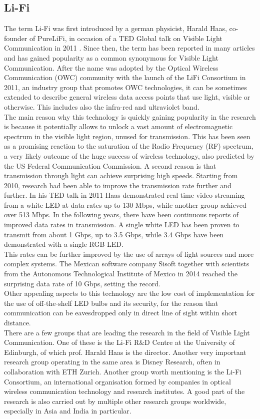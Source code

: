 \subsection{Li-Fi}
The term Li-Fi was first introduced by a german physicist, Harald Haas, co-founder of PureLiFi, in occasion of a TED Global talk on Visible Light Communication in 2011 \cite{tedtalk}.
Since then, the term has been reported in many articles and has gained popularity as a common synonymous for Visible Light Communication.
After the name was adopted by the Optical Wireless Communication (OWC) community with the launch of the LiFi Consortium in 2011, an industry group that promotes OWC technologies, it can be sometimes extended to describe general wireless data access points that use light, visible or otherwise.
This includes also the infra-red and ultraviolet band.\\
The main reason why this technology is quickly gaining popularity in the research is because it potentially allows to unlock a vast amount of electromagnetic spectrum in the visible light region, unused for transmission.\cite{haas1}
This has been seen as a promising reaction to the saturation of the Radio Frequency (RF) spectrum, a very likely outcome of the huge success of wireless technology, also predicted by the US Federal Communication Commission\cite{crisis}. 
A second reason is that transmission through light can achieve surprising high speeds.
Starting from 2010, research had been able to improve the transmission rate further and further.
In his TED talk in 2011 Haas demonstrated real time video streaming from a white LED at data rates up to 130 Mbps\cite{tedtalk}, while another group achieved over 513 Mbps\cite{500Mbps}.
In the following years, there have been continuous reports of improved data rates in transmission.
A single white LED has been proven to transmit from about 1 Gbps\cite{1Gbps}, up to 3.5 Gbps\cite{3.5Gbps}, while 3.4 Gbps have been demonstrated with a single RGB LED\cite{3.4Gbps}.\\
This rates can be further improved by the use of arrays of light sources and more complex systems.
The Mexican software company Sisoft together with scientists from the Autonomous Technological
Institute of Mexico in 2014 reached the surprising data rate of 10 Gbps, setting the record.\\
Other appealing aspects to this technology are the low cost of implementation for the use of off-the-shelf LED bulbs and its security, for the reason that communication can be eavesdropped only in direct line of sight within short distance.\\
There are a few groups that are leading the research in the field of Visible Light Communication.
One of these is the Li-Fi R\&D Centre at the University of Edinburgh, of which prof. Harald Haas is the director.
Another very important research group operating in the same area is Disney Research, often in collaboration with ETH Zurich.
Another group worth mentioning is the Li-Fi Consortium, an international organisation formed by companies in optical wireless communication technology and research institutes.
A good part of the research is also carried out by multiple other research groups worldwide, especially in Asia and India in particular.


